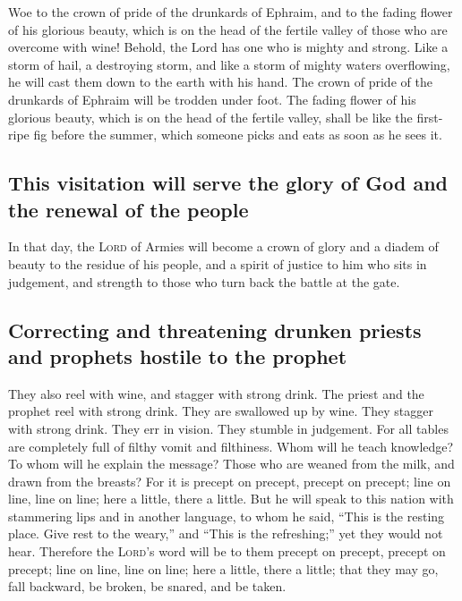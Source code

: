  Woe to the crown of pride of the drunkards of Ephraim,
and to the fading flower of his glorious beauty, which is on the head of
the fertile valley of those who are overcome with wine! 
Behold, the Lord has one who is mighty and strong. Like a storm of hail,
a destroying storm, and like a storm of mighty waters overflowing, he
will cast them down to the earth with his hand.  The crown
of pride of the drunkards of Ephraim will be trodden under foot.
 The fading flower of his glorious beauty, which is on the
head of the fertile valley, shall be like the first-ripe fig before the
summer, which someone picks and eats as soon as he sees it.

\hypertarget{this-visitation-will-serve-the-glory-of-god-and-the-renewal-of-the-people}{%
\subsection{This visitation will serve the glory of God and the renewal
of the
people}\label{this-visitation-will-serve-the-glory-of-god-and-the-renewal-of-the-people}}

 In that day, the \textsc{Lord} of Armies will become a
crown of glory and a diadem of beauty to the residue of his people,
 and a spirit of justice to him who sits in judgement, and
strength to those who turn back the battle at the gate.

\hypertarget{correcting-and-threatening-drunken-priests-and-prophets-hostile-to-the-prophet}{%
\subsection{Correcting and threatening drunken priests and prophets
hostile to the
prophet}\label{correcting-and-threatening-drunken-priests-and-prophets-hostile-to-the-prophet}}

 They also reel with wine, and stagger with strong drink.
The priest and the prophet reel with strong drink. They are swallowed up
by wine. They stagger with strong drink. They err in vision. They
stumble in judgement.  For all tables are completely full
of filthy vomit and filthiness.  Whom will he teach
knowledge? To whom will he explain the message? Those who are weaned
from the milk, and drawn from the breasts?  For it is
precept on precept, precept on precept; line on line, line on line; here
a little, there a little.  But he will speak to this
nation with stammering lips and in another language,  to
whom he said, ``This is the resting place. Give rest to the weary,'' and
``This is the refreshing;'' yet they would not hear. 
Therefore the \textsc{Lord}'s word will be to them precept on precept,
precept on precept; line on line, line on line; here a little, there a
little; that they may go, fall backward, be broken, be snared, and be
taken.

